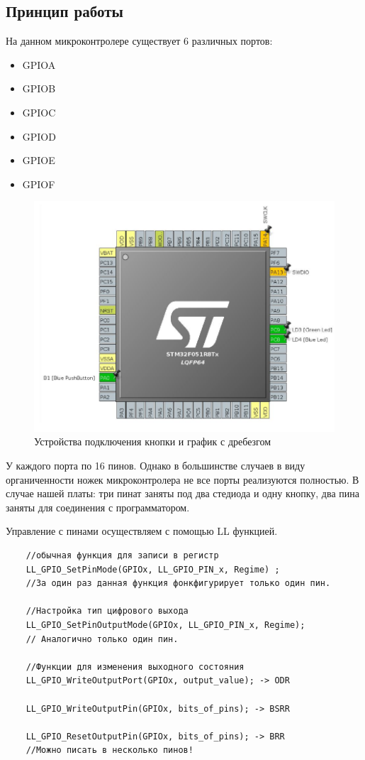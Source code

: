 \subsection{Принцип работы}

На данном микроконтролере существует 6 различных портов:
\begin{itemize}
    \item GPIOA
    \item GPIOB
    \item GPIOC
    \item GPIOD
    \item GPIOE
    \item GPIOF
\end{itemize}   


\begin{figure}[h!]
		\centering
		\includegraphics[width=1\linewidth]{pics/scheme.png}
		\caption{Устройства подключения кнопки и график с дребезгом}
		\label{drebezg}
\end{figure}

У каждого порта по 16 пинов. Однако в большинстве случаев в виду органиченности ножек микроконтролера не все порты реализуются полностью. В случае нашей платы: три пинат заняты под два стедиода и одну кнопку, два пина заняты для соединения с программатором. 


Управление с пинами осуществляем с помощью LL функцией.

\begin{verbatim}
    //обычная функция для записи в регистр
    LL_GPIO_SetPinMode(GPIOx, LL_GPIO_PIN_x, Regime) ;
    //За один раз данная функция фонкфигурирует только один пин.

    //Настройка тип цифрового выхода
    LL_GPIO_SetPinOutputMode(GPIOx, LL_GPIO_PIN_x, Regime);
    // Аналогично только один пин.
    
    //Функции для изменения выходного состояния
    LL_GPIO_WriteOutputPort(GPIOx, output_value); -> ODR
    
    LL_GPIO_WriteOutputPin(GPIOx, bits_of_pins); -> BSRR
    
    LL_GPIO_ResetOutputPin(GPIOx, bits_of_pins); -> BRR
    //Можно писать в несколько пинов!

\end{verbatim}


